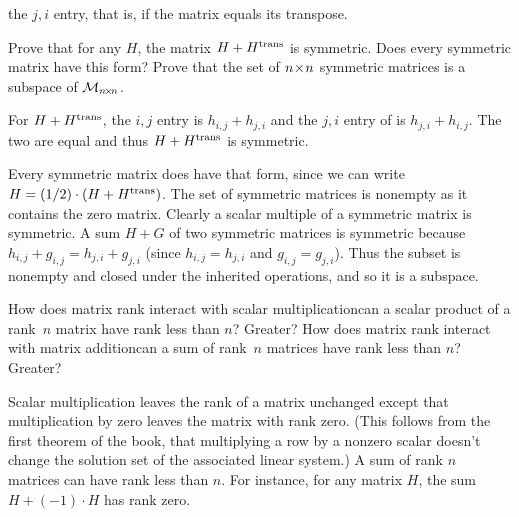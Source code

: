 \begin{exercises}
    the \( j,i \) entry, that is, if the matrix equals its transpose.
    \begin{exparts}
      \partsitem Prove that for any $H$,
        the matrix \( H+{{H}^{\rm trans}} \) is symmetric.
        Does every symmetric matrix have this form?
      \partsitem Prove that the set of \( n \! \times \! n \) symmetric matrices is
        a subspace of \( \mathcal{M}_{n \! \times \! n} \).
    \end{exparts}
    \begin{answer}  
      \begin{exparts}
        \partsitem For \( H+{{H}^{\rm trans}} \), the \( i,j \) entry 
          is \( h_{i,j}+h_{j,i} \) and
          the \( j,i \) entry of  is \( h_{j,i}+h_{i,j} \).
          The two are equal and thus \( H+{{H}^{\rm trans}} \) is symmetric.

          Every symmetric matrix does have that form, since we can write
          \( H=(1/2)\cdot(H+{{H}^{\rm trans}}) \).
        \partsitem The set of symmetric matrices is nonempty as it
          contains the zero matrix.
          Clearly a scalar multiple of a symmetric matrix is symmetric.
          A sum \( H+G \) of two symmetric matrices is
          symmetric because \( h_{i,j}+g_{i,j}=h_{j,i}+g_{j,i} \) (since
          \( h_{i,j}=h_{j,i} \) and \( g_{i,j}=g_{j,i} \)).
          Thus the subset is nonempty and closed under the inherited
          operations, and so it is a subspace.
      \end{exparts} 
    \end{answer}
  \recommended \item 
    \begin{exparts}
      \partsitem How does matrix rank interact with 
        scalar multiplication\Dash can
        a scalar product of a rank~\( n \) matrix have rank less than \( n \)?
        Greater?
      \partsitem How does matrix rank interact with matrix 
        addition\Dash can a sum of
        rank~\( n \) matrices have rank less than \( n \)?
        Greater?
    \end{exparts}
    \begin{answer}  
      \begin{exparts}
        \partsitem Scalar multiplication leaves the rank of a matrix unchanged
          except that multiplication by zero leaves the matrix
          with rank zero.
          (This follows from the first theorem of the book, that multiplying a
          row by a nonzero 
          scalar doesn't change the solution set of the associated
          linear system.)
        \partsitem A sum of rank \( n \) matrices can have rank 
          less than \( n \).
          For instance,
          for any matrix \( H \), the sum \( H+(-1)\cdot H \) has rank zero.


\end{exparts}
\end{answer}
\end{exercises}
